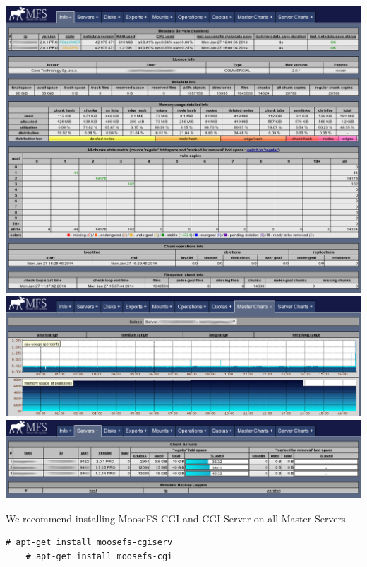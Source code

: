\documentclass[a4paper,11pt,english]{report}
\begin{document}
			\begin{center}
				\includegraphics[width=1\textwidth]{images/mfsscr1_blur.png}\\[1cm]
				\includegraphics[width=1\textwidth]{images/mfsscr3_blur.png}\\[0.5cm]
				\includegraphics[width=1\textwidth]{images/mfsscr2_blur.png}\\[0.5cm]
			\end{center}
			
			\bigskip
			
			We recommend installing MooseFS CGI and CGI Server on all Master Servers.
			
			\bigskip
			
			\begin{lstlisting}[caption={MooseFS CGI and CGI Server installation}]
	# apt-get install moosefs-cgiserv
	# apt-get install moosefs-cgi
			\end{lstlisting}
			
\end{document}
